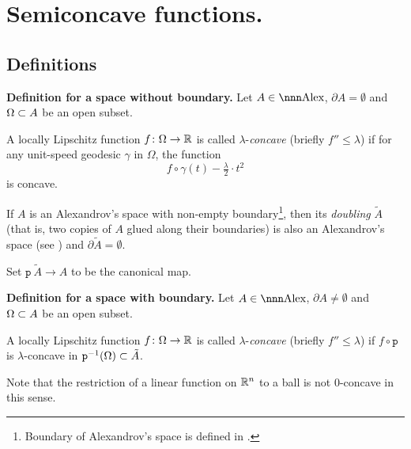 \documentclass{article}
\begin{document}
\newpage





\section{Semiconcave functions.}\label{CF}

\subsection{Definitions}

\begin{thm}{\bf Definition for a space without boundary.}\label{def:with-no-bry} 
Let $A\in\Alex$, 
$\partial A=\emptyset$ 
and $\Omega\subset A$ be an open subset.

A locally Lipschitz function $f\colon\Omega \rightarrow \mathbb{R}$ is called
$\lambda$-\emph{concave} (briefly $f''\le \lambda$) if for any unit-speed geodesic $\gamma$ 
in $\Omega$, the function
$$f\circ\gamma(t)-\tfrac\lambda2{\cdot}t^2$$
is concave.
\end{thm}


If $A$ is an Alexandrov's space with non-empty boundary\footnote{Boundary of Alexandrov's space is defined in \cite[7.19]{BGP}.}, 
then its \emph{doubling} $\tilde A$
(that is, two copies of $A$ glued along their boundaries) 
is also an Alexandrov's space (see \cite[5.2]{perelman:spaces2}) and $\partial \tilde A=\emptyset$.

Set $\mathtt{p}\:\tilde A\to A$ to be the canonical map. 

\begin{thm}{\bf Definition for a space with boundary.}\label{def:with-bry}  Let $A\in\Alex$, $\partial A\not=\emptyset$ and $\Omega\subset A$ be an open subset.

A locally  Lipschitz function $f\colon \Omega \rightarrow \mathbb{R}$ is called $\lambda$-\emph{concave} (briefly $f''\le \lambda$) if $ f\circ \mathtt{p}$ is $\lambda$-{concave} in $\mathtt{p}^{-1}(\Omega)\subset \tilde A$.
\end{thm}


 Note that the restriction of a linear function on $\mathbb{R}^n$ to a ball is not $0$-concave in this sense.
\end{document}
